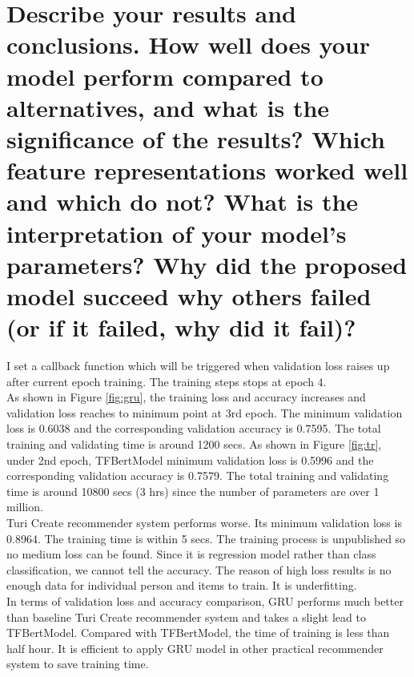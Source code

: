\documentclass[12pt]{article}
\begin{document}
\section{Describe your results and conclusions. How well does your model perform compared to
alternatives, and what is the significance of the results? Which feature representations worked
well and which do not? What is the interpretation of your model’s parameters? Why did the
proposed model succeed why others failed (or if it failed, why did it fail)?}
I set a callback function which will be triggered when validation loss raises up after current epoch training.
The training steps stops at epoch 4.\\
As shown in Figure \ref{fig:gru}, the training loss and accuracy increases and validation loss reaches to minimum
point at 3rd epoch. The minimum validation loss is 0.6038 and the corresponding validation accuracy is 0.7595.
The total training and validating time is around 1200 secs.
As shown in Figure \ref{fig:tr}, under 2nd epoch, TFBertModel minimum validation loss is 0.5996 and the
corresponding validation accuracy is 0.7579. The total training and validating time is around 10800 secs (3 hrs)
since the number of parameters are over 1 million.\\
Turi Create recommender system performs worse. Its minimum validation loss is 0.8964. The training time is within 5 secs.
The training process is unpublished so no medium loss can be found.
Since it is regression model rather than class classification, we cannot tell the accuracy.
The reason of high loss results is no enough data for individual person
and items to train. It is underfitting.\\
In terms of validation loss and accuracy comparison, GRU performs much better than baseline Turi Create recommender
system
and takes a slight lead to TFBertModel.
Compared with TFBertModel, the time of training is less than half hour. It is efficient to apply GRU model in
other practical recommender system to save training time.
\end{document}
